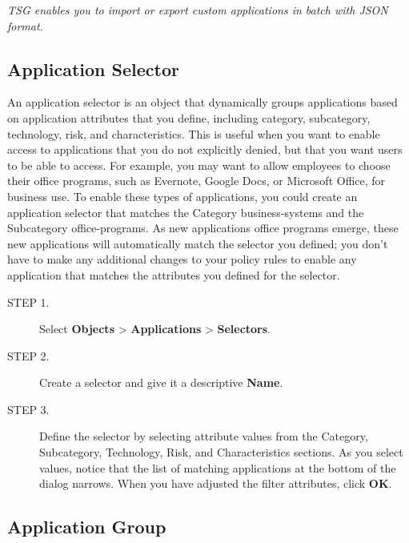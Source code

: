 \notemark\textit{TSG enables you to import or export custom applications in batch with JSON format.}

\subsection*{\hypertarget{link:Application Selector}{Application Selector}}
\label{sec:objects:application:selector}

An application selector is an object that dynamically groups applications based on application attributes that you define, 
including category, subcategory, technology, risk, and characteristics. This is useful when you want to enable access to applications that you do not explicitly denied, 
but that you want users to be able to access. For example, you may want to allow employees to choose their office programs, 
such as Evernote, Google Docs, or Microsoft Office, for business use. To enable these types of applications, 
you could create an application selector that matches the Category business-systems and the Subcategory office-programs. 
As new applications office programs emerge, these new applications will automatically match the selector you defined; 
you don’t have to make any additional changes to your policy rules to enable any application that matches the attributes you defined for the selector.

\begin{description}
    \item[STEP 1.]	Select \textbf{Objects} > \textbf{Applications} > \textbf{Selectors}.
    \item[STEP 2.]	Create a selector and give it a descriptive \textbf{Name}.
    \item[STEP 3.]	Define the selector by selecting attribute values from the Category, Subcategory, Technology, Risk, and Characteristics sections. 
    As you select values, notice that the list of matching applications at the bottom of the dialog narrows. 
    When you have adjusted the filter attributes, click \textbf{OK}.
\end{description}

\subsection*{\hypertarget{link:Application Group}{Application Group}}
\label{sec:objects:application:group}

